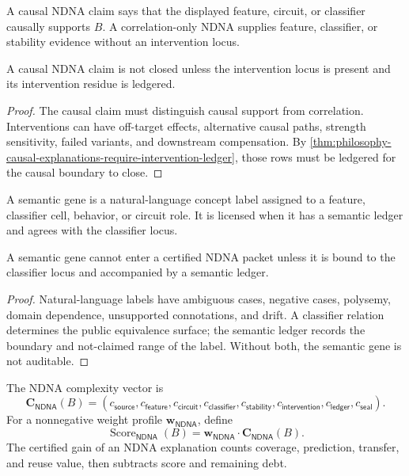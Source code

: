 \begin{definition}
\label{def:philosophy-causal-correlation-ndna}
A causal NDNA claim says that the displayed feature, circuit, or
classifier causally supports $B$. A correlation-only NDNA supplies
feature, classifier, or stability evidence without an intervention locus.
\end{definition}

\begin{theorem}
\label{thm:philosophy-causal-ndna-requires-intervention-ledger}
A causal NDNA claim is not closed unless the intervention locus is
present and its intervention residue is ledgered.
\end{theorem}
\begin{proof}
The causal claim must distinguish causal support from correlation.
Interventions can have off-target effects, alternative causal paths,
strength sensitivity, failed variants, and downstream compensation. By
\autoref{thm:philosophy-causal-explanations-require-intervention-ledger},
those rows must be ledgered for the causal boundary to close.
\end{proof}

\begin{definition}
\label{def:philosophy-semantic-ndna-gene}
A semantic gene is a natural-language concept label assigned to a
feature, classifier cell, behavior, or circuit role. It is licensed when
it has a semantic ledger and agrees with the classifier locus.
\end{definition}

\begin{theorem}
\label{thm:philosophy-semantic-genes-require-classifier-ledger}
A semantic gene cannot enter a certified NDNA packet unless it is bound
to the classifier locus and accompanied by a semantic ledger.
\end{theorem}
\begin{proof}
Natural-language labels have ambiguous cases, negative cases, polysemy,
domain dependence, unsupported connotations, and drift. A classifier
relation determines the public equivalence surface; the semantic ledger
records the boundary and not-claimed range of the label. Without both,
the semantic gene is not auditable.
\end{proof}

\begin{definition}
\label{def:philosophy-ndna-score-certified-gain}
The NDNA complexity vector is
$$
\mathbf C_{\mathsf{NDNA}}(B)
=
(
c_{\mathsf{source}},
c_{\mathsf{feature}},
c_{\mathsf{circuit}},
c_{\mathsf{classifier}},
c_{\mathsf{stability}},
c_{\mathsf{intervention}},
c_{\mathsf{ledger}},
c_{\mathsf{seal}}
).
$$
For a nonnegative weight profile $\mathbf w_{\mathsf{NDNA}}$, define
$$
\operatorname{Score}_{\mathsf{NDNA}}(B)
=
\mathbf w_{\mathsf{NDNA}}\cdot\mathbf C_{\mathsf{NDNA}}(B).
$$
The certified gain of an NDNA explanation counts coverage, prediction,
transfer, and reuse value, then subtracts score and remaining debt.
\end{definition}

